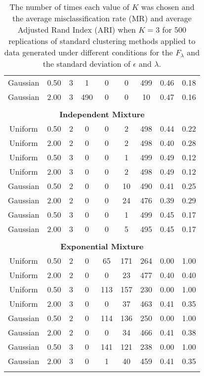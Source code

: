 \begin{table}[ht]
\begin{center}
\begin{tabular}{ccc|cccccc}
  Gaussian & 0.50 &   3 &   1 &   0 &   0 & 499 & 0.46 & 0.18 \\ 
  Gaussian & 2.00 &   3 & 490 &   0 &   0 &  10 & 0.47 & 0.16 \\ 
   \\ \multicolumn{9}{c}{\textbf{Independent Mixture}}\\Uniform & 0.50 &   2 &   0 &   0 &   2 & 498 & 0.44 & 0.22 \\ 
  Uniform & 2.00 &   2 &   0 &   0 &   2 & 498 & 0.40 & 0.28 \\ 
  Uniform & 0.50 &   3 &   0 &   0 &   1 & 499 & 0.49 & 0.12 \\ 
  Uniform & 2.00 &   3 &   0 &   0 &   2 & 498 & 0.49 & 0.12 \\ 
  Gaussian & 0.50 &   2 &   0 &   0 &  10 & 490 & 0.41 & 0.25 \\ 
  Gaussian & 2.00 &   2 &   0 &   0 &  24 & 476 & 0.39 & 0.29 \\ 
  Gaussian & 0.50 &   3 &   0 &   0 &   1 & 499 & 0.45 & 0.17 \\ 
  Gaussian & 2.00 &   3 &   0 &   0 &   5 & 495 & 0.45 & 0.17 \\ 
   \\ \multicolumn{9}{c}{\textbf{Exponential Mixture}}\\Uniform & 0.50 &   2 &   0 &  65 & 171 & 264 & 0.00 & 1.00 \\ 
  Uniform & 2.00 &   2 &   0 &   0 &  23 & 477 & 0.40 & 0.40 \\ 
  Uniform & 0.50 &   3 &   0 & 113 & 157 & 230 & 0.00 & 1.00 \\ 
  Uniform & 2.00 &   3 &   0 &   0 &  37 & 463 & 0.41 & 0.35 \\ 
  Gaussian & 0.50 &   2 &   0 & 114 & 136 & 250 & 0.00 & 1.00 \\ 
  Gaussian & 2.00 &   2 &   0 &   0 &  34 & 466 & 0.41 & 0.38 \\ 
  Gaussian & 0.50 &   3 &   0 & 141 & 121 & 238 & 0.00 & 1.00 \\ 
  Gaussian & 2.00 &   3 &   0 &   1 &  40 & 459 & 0.41 & 0.35 \\ 
   \thickhline\end{tabular}
\caption{The number of times each value of $K$ was chosen and the average misclassification rate (MR) and average Adjusted Rand Index (ARI) when $K=3$ for 500 replications of standard clustering methods applied to data generated under different conditions for the $F_{\lambda}$ and the standard deviation of $\epsilon$ and $\lambda$.}
\label{tab:freq1}
\end{center}
\end{table}

